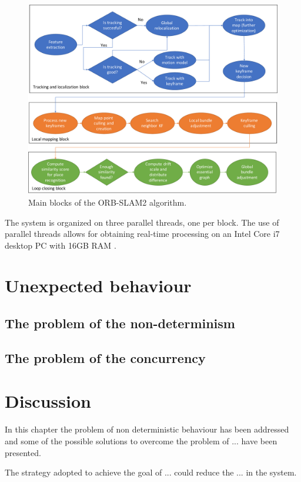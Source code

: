 \begin{figure}
	\centering
	\includegraphics[width=\textwidth]{images/orb-slam-overview}
	\caption{Main blocks of the ORB-SLAM2 algorithm.}
	\label{fig:orbslam}
\end{figure}

The system is organized on three parallel threads, one per block. The use of parallel threads allows for obtaining real-time processing on an Intel Core i7 desktop PC with 16GB RAM \cite{murORB2}.


\section{Unexpected behaviour}

\subsection{The problem of the non-determinism} %


\subsection{The problem of the concurrency} %




\section{Discussion}
In this chapter the problem of non deterministic behaviour has been addressed and some of the possible solutions to overcome the problem of ...  have been presented.

The strategy adopted to achieve the goal of ... could reduce the ... in the system.


\clearpage
\thispagestyle{empty}